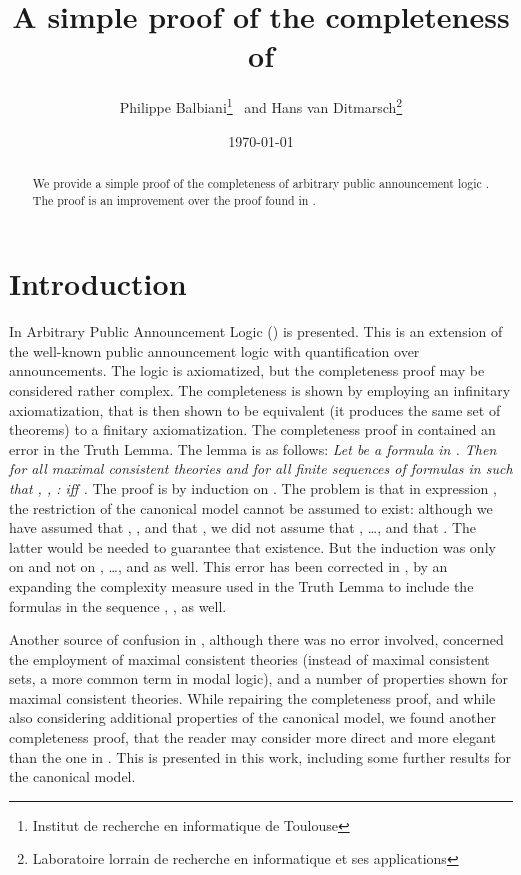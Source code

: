 \documentclass{article}[12pt]
\newcommand{\weg}[1]{}
\begin{document}
\title{A simple proof of the completeness of }
\author{Philippe Balbiani\thanks{Institut de recherche en informatique de Toulouse} \ and Hans van Ditmarsch\thanks{Laboratoire lorrain de recherche en informatique et ses applications}}
\date{\today}
\maketitle
\begin{abstract}
We provide a simple proof of the completeness of arbitrary public announcement logic . The proof is an improvement over the proof found in \cite{balbianietal:2008}.
\end{abstract}
\section{Introduction}
In \cite{balbianietal:2008} Arbitrary Public Announcement Logic () is presented. This is an extension of the well-known public announcement logic \cite{plaza:1989} with quantification over announcements. The logic is axiomatized, but the completeness proof may be considered rather complex. The completeness is shown by employing an infinitary axiomatization, that is then shown to be equivalent (it produces the same set of theorems) to a finitary axiomatization. The completeness proof in \cite{balbianietal:2008} contained an error in the Truth Lemma. The lemma is as follows: \weg{\begin{quote}} {\em Let  be a formula in . Then for all maximal consistent theories
 and for all finite sequences 
of formulas in  such that , , :   iff .} \weg{\end{quote}} The proof is by induction on . The problem is that in expression , the restriction 
of the canonical model  cannot be assumed to exist: although we have assumed that
, , and that , we did not assume that , \dots, and that . The latter would be needed to guarantee that existence. But the induction was only on  and not on , \dots, and  as well. This error has been corrected in \cite{philippe.corrected:2014}, by an expanding the complexity measure used in the Truth Lemma to include the formulas in the sequence , ,  as well. 

Another source of confusion in \cite{balbianietal:2008}, although there was no error involved, concerned the employment of maximal consistent theories (instead of maximal consistent sets, a more common term in modal logic), and a number of properties shown for maximal consistent theories. While repairing the completeness proof, and while also considering additional properties of the canonical model, we found another completeness proof, that the reader may consider more direct and more elegant than the one in \cite{balbianietal:2008,philippe.corrected:2014}. This is presented in this work, including some further results for the canonical model.
\end{document}
